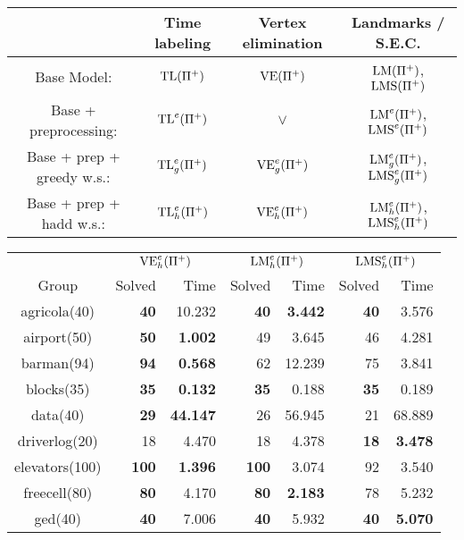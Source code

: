 \begin{center}
    \begin{tabular}{ |c|c|c|c| } 
      \hline
         & Time labeling & Vertex elimination & Landmarks / S.E.C. \\
      \hline
      Base Model: & $\mbox{TL}(\Pi^+)$ & $\mbox{VE}(\Pi^+)$ & $\mbox{LM}(\Pi^+)$, $\mbox{LMS}(\Pi^+)$ \\
      \hline
      Base + preprocessing: & $\mbox{TL}^e(\Pi^+)$ & $\vee$ & $\mbox{LM}^e(\Pi^+)$, $\mbox{LMS}^e(\Pi^+)$ \\
      \hline
      Base + prep + greedy w.s.: & $\mbox{TL}^e_g(\Pi^+)$ & $\mbox{VE}^e_g(\Pi^+)$ & $\mbox{LM}^e_g(\Pi^+)$, $\mbox{LMS}^e_g(\Pi^+)$ \\
      \hline
      Base + prep + hadd w.s.: & $\mbox{TL}^e_h(\Pi^+)$ & $\mbox{VE}^e_h(\Pi^+)$ & $\mbox{LM}^e_h(\Pi^+)$, $\mbox{LMS}^e_h(\Pi^+)$ \\
      \hline
    \end{tabular}
\end{center}
\begin{center}
  \begin{tabular}{c rr rr rr}
    \toprule
    & \multicolumn{2}{c}{$\mbox{VE}^e_h(\Pi^+)$} & \multicolumn{2}{c}{$\mbox{LM}^e_h(\Pi^+)$} & \multicolumn{2}{c}{$\mbox{LMS}^e_h(\Pi^+)$} \\
    \cmidrule(lr){2-3} \cmidrule(lr){4-5} \cmidrule(lr){6-7}
    Group & Solved & Time & Solved & Time & Solved & Time \\
    \midrule
    agricola(40)    & \textbf{40}   & 10.232            & \textbf{40}   & \textbf{3.442}      & \textbf{40}   & 3.576 \\
    airport(50)     & \textbf{50}   & \textbf{1.002}    & 49            & 3.645               & 46            & 4.281 \\
    barman(94)      & \textbf{94}   & \textbf{0.568}    & 62            & 12.239              & 75            & 3.841 \\
    blocks(35)      & \textbf{35}   & \textbf{0.132}    & \textbf{35}   & 0.188               & \textbf{35}   & 0.189 \\
    data(40)        & \textbf{29}   & \textbf{44.147}   & 26            & 56.945              & 21            & 68.889 \\
    driverlog(20)   & 18            & 4.470             & 18            & 4.378               & \textbf{18}   & \textbf{3.478} \\
    elevators(100)  & \textbf{100}  & \textbf{1.396}    & \textbf{100}  & 3.074               & 92            & 3.540 \\
    freecell(80)    & \textbf{80}   & 4.170             & \textbf{80}   & \textbf{2.183}      & 78            & 5.232 \\
    ged(40)         & \textbf{40}   & 7.006             & \textbf{40}   & 5.932               & \textbf{40}   & \textbf{5.070} \\

\end{tabular}
\end{center}
